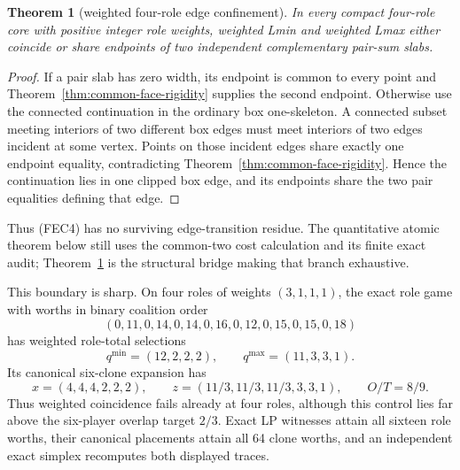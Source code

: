 \documentclass[11pt]{article}
\newtheorem{theorem}{Theorem}
\begin{document}
\begin{theorem}[weighted four-role edge confinement]
\label{thm:four-role-confinement}
In every compact four-role core with positive integer role weights, weighted
Lmin and weighted Lmax either coincide or share endpoints of two independent
complementary pair-sum slabs.
\end{theorem}

\begin{proof}
If a pair slab has zero width, its endpoint is common to every point and
Theorem~\ref{thm:common-face-rigidity} supplies the second endpoint.  Otherwise
use the connected continuation in the ordinary box one-skeleton.  A connected
subset meeting interiors of two different box edges must meet interiors of
two edges incident at some vertex.  Points on those incident edges share
exactly one endpoint equality, contradicting
Theorem~\ref{thm:common-face-rigidity}.  Hence the continuation lies in one
clipped box edge, and its endpoints share the two pair equalities defining
that edge.
\end{proof}

Thus (FEC4) has no surviving edge-transition residue.  The quantitative
atomic theorem below still uses the common-two cost calculation and its
finite exact audit; Theorem~\ref{thm:four-role-confinement} is the structural
bridge making that branch exhaustive.

This boundary is sharp.  On four roles of weights $(3,1,1,1)$, the exact
role game with worths in binary coalition order
\[
 (0,11,0,14,0,14,0,16,0,12,0,15,0,15,0,18)         \tag{W4O1}
\]
has weighted role-total selections
\[
 q^{\min}=(12,2,2,2),\qquad q^{\max}=(11,3,3,1).     \tag{W4O2}
\]
Its canonical six-clone expansion has
\[
 x=(4,4,4,2,2,2),\qquad
 z=(11/3,11/3,11/3,3,3,1),\qquad O/T=8/9.            \tag{W4O3}
\]
Thus weighted coincidence fails already at four roles, although this control
lies far above the six-player overlap target $2/3$.  Exact LP witnesses attain
all sixteen role worths, their canonical placements attain all 64 clone
worths, and an independent exact simplex recomputes both displayed traces.
\end{document}
